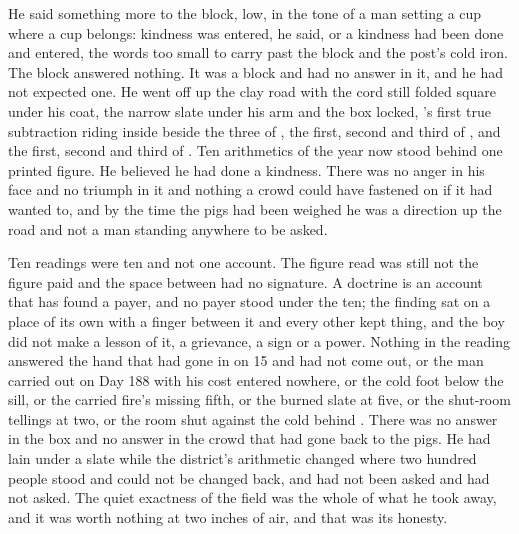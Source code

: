 He said something more to the block, low, in the tone of a man setting a cup where a cup belongs: kindness was entered, he said, or a kindness had been done and entered, the words too small to carry past the block and the post's cold iron. The block answered nothing. It was a block and had no answer in it, and he had not expected one. He went off up the clay road with the cord still folded square under his coat, the narrow slate under his arm and the box locked, 's first true subtraction riding inside beside the three of , the first, second and third of , and the first, second and third of . Ten arithmetics of the year now stood behind one printed figure. He believed he had done a kindness. There was no anger in his face and no triumph in it and nothing a crowd could have fastened on if it had wanted to, and by the time the pigs had been weighed he was a direction up the road and not a man standing anywhere to be asked.

Ten readings were ten and not one account. The figure read was still not the figure paid and the space between had no signature. A doctrine is an account that has found a payer, and no payer stood under the ten; the finding sat on a place of its own with a finger between it and every other kept thing, and the boy did not make a lesson of it, a grievance, a sign or a power. Nothing in the reading answered the hand that had gone in on  15 and had not come out, or the man carried out on Day 188 with his cost entered nowhere, or the cold foot below the sill, or the carried fire's missing fifth, or the burned slate at five, or the shut-room tellings at two, or the room shut against the cold behind . There was no answer in the box and no answer in the crowd that had gone back to the pigs. He had lain under a slate while the district's arithmetic changed where two hundred people stood and could not be changed back, and had not been asked and had not asked. The quiet exactness of the field was the whole of what he took away, and it was worth nothing at two inches of air, and that was its honesty.

\scenebreak

